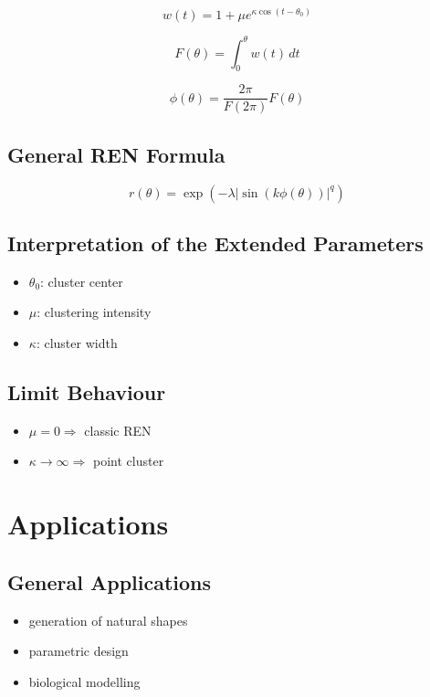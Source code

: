\documentclass[11pt,a4paper]{article}
\begin{document}
\begin{equation}
w(t) = 1 + \mu e^{\kappa \cos(t - \theta_0)}
\end{equation}

\begin{equation}
F(\theta) = \int_0^\theta w(t)\,dt
\end{equation}

\begin{equation}
\phi(\theta) = \frac{2\pi}{F(2\pi)} F(\theta)
\end{equation}

\subsection{General REN Formula}

\begin{equation}
r(\theta) = \exp\left(-\lambda \left| \sin(k\phi(\theta)) \right|^q \right)
\end{equation}

\subsection{Interpretation of the Extended Parameters}
\begin{itemize}
    \item $\theta_0$: cluster center
    \item $\mu$: clustering intensity
    \item $\kappa$: cluster width
\end{itemize}

\subsection{Limit Behaviour}
\begin{itemize}
    \item $\mu = 0 \Rightarrow$ classic REN
    \item $\kappa \to \infty \Rightarrow$ point cluster
\end{itemize}

\section{Applications}

\subsection{General Applications}
\begin{itemize}
    \item generation of natural shapes
    \item parametric design
    \item biological modelling
\end{itemize}
\end{document}
